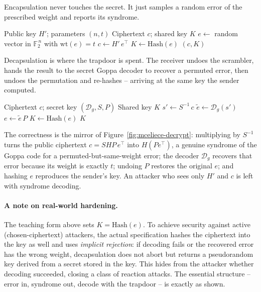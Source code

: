 Encapsulation never touches the secret. It just samples a random error of the prescribed weight and reports its syndrome.

\begin{algorithm}[H]
\caption{Classic McEliece Encapsulate (teaching form)}
\label{alg:mce-encap}
\begin{algorithmic}[1]
\Require Public key $H'$; parameters $(n,t)$
\Ensure Ciphertext $c$; shared key $K$
\State $e \gets$ random vector in $\mathbb{F}_2^{\,n}$ with $\mathrm{wt}(e) = t$ 
\State $c \gets H'\,e^\top$ 
\State $K \gets \mathrm{Hash}(e)$ 
\State \Return $(c, K)$
\end{algorithmic}
\end{algorithm}

Decapsulation is where the trapdoor is spent. The receiver undoes the scrambler, hands the result to the secret Goppa decoder to recover a permuted error, then undoes the permutation and re-hashes -- arriving at the same key the sender computed.

\begin{algorithm}[H]
\caption{Classic McEliece Decapsulate (teaching form)}
\label{alg:mce-decap}
\begin{algorithmic}[1]
\Require Ciphertext $c$; secret key $(\mathcal{D}_g, S, P)$
\Ensure Shared key $K$
\State $s' \gets S^{-1}\,c$ 
\State $\tilde e \gets \mathcal{D}_g(s')$ 
\State $e \gets \tilde e\,P$ 
\State $K \gets \mathrm{Hash}(e)$ 
\State \Return $K$
\end{algorithmic}
\end{algorithm}

The correctness is the mirror of Figure~\ref{fig:mceliece-decrypt}: multiplying by $S^{-1}$ turns the public ciphertext $c = SHP\,e^\top$ into $H(Pe^\top)$, a genuine syndrome of the Goppa code for a permuted-but-same-weight error; the decoder $\mathcal{D}_g$ recovers that error because its weight is exactly $t$; undoing $P$ restores the original $e$; and hashing $e$ reproduces the sender's key. An attacker who sees only $H'$ and $c$ is left with syndrome decoding.

\paragraph{A note on real-world hardening.}
The teaching form above sets $K = \mathrm{Hash}(e)$. To achieve security against active (chosen-ciphertext) attackers, the actual specification hashes the ciphertext into the key as well and uses \emph{implicit rejection}: if decoding fails or the recovered error has the wrong weight, decapsulation does not abort but returns a pseudorandom key derived from a secret stored in the key. This hides from the attacker whether decoding succeeded, closing a class of reaction attacks. The essential structure -- error in, syndrome out, decode with the trapdoor -- is exactly as shown.

